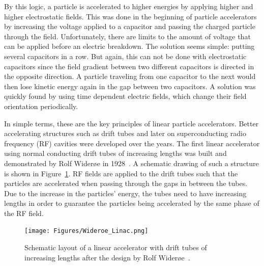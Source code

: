 By this logic, a particle is accelerated to higher energies by applying higher and higher electrostatic fields. 
This was done in the beginning of particle accelerators by increasing the voltage applied to a capacitor and passing the charged particle through the field. 
Unfortunately, there are limits to the amount of voltage that can be applied before an electric breakdown.
The solution seems simple: putting several capacitors in a row.
But again, this can not be done with electrostatic capacitors since the field gradient between two different capacitors is directed in the opposite direction.
A particle traveling from one capacitor to the next would then lose kinetic energy again in the gap between two capacitors.
A solution was quickly found by using time dependent electric fields, which change their field  orientation periodically.

In simple terms, these are the key principles of linear particle accelerators.
Better accelerating structures such as drift tubes and later on superconducting radio frequency (RF) cavities were developed over the years.
The first linear accelerator using normal conducting drift tubes of increasing lengths was built and demonstrated by Rolf Wider\o e in 1928~\cite[p. 6]{Wilson}.
A schematic drawing of such a structure is shown in Figure~\ref{fig:Wideroe_Linac}.
RF fields are applied to the drift tubes such that the particles are accelerated when passing through the gaps in between the tubes.
Due to the increase in the particles' energy, the tubes need to have increasing lengths in order to guarantee the particles being accelerated by the same phase of the RF field.
\begin{figure}
\centering
\texttt{[image: Figures/Wideroe\_Linac.png]}
\caption[Schematic layout of a Wider\o e linac]{Schematic layout of a linear accelerator with drift tubes of increasing lengths after the design by Rolf Wider\o e~\cite[p. 40]{Hinterberger}.}
\label{fig:Wideroe_Linac}
\end{figure}

